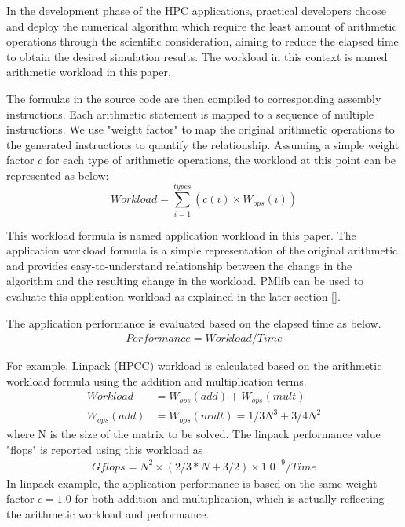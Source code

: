 \documentclass[conference]{IEEEtran}
\begin{document}
In the development phase of the HPC applications, practical developers
choose and deploy the numerical algorithm which require the least
amount of arithmetic operations through the scientific consideration,
aiming to reduce the elapsed time to obtain the desired simulation results.
The workload in this context is named arithmetic workload in this paper.


The formulas in the source code are then compiled to corresponding assembly
instructions.
Each arithmetic statement is mapped to a sequence of multiple instructions.
We use "weight factor" to map the original arithmetic operations to the
generated instructions to quantify the relationship.
Assuming a simple weight factor $ c $ for each type of
arithmetic operations, 
the workload at this point can be represented as below:
\begin{equation}\label{application-workload}
		Workload = \sum_{i=1}^{types} \left(c(i)\times W_{ops}(i)\right)
\end{equation}

This workload formula is named application workload in this paper.
The application workload formula is a simple representation of the original
arithmetic and provides easy-to-understand relationship between the change
in the algorithm and the resulting change in the workload.
PMlib can be used to evaluate this application workload as explained
in the later section \ref{}.

The application performance is evaluated based on the elapsed time as below.
\begin{align}\label{performance-workload-time}
Performance = Workload / Time 
\end{align}

For example, Linpack (HPCC) 
\cite{}
workload is calculated based on the arithmetic workload formula
using the addition and multiplication terms.
\begin{align}
		Workload & = W_{ops}(add) + W_{ops}(mult) \\
		W_{ops}(add) & = W_{ops}(mult) = 1/3 N^{3} + 3/4 N^{2}
\end{align}
where N is the size of the matrix to be solved.
The linpack performance value "flops" is reported using this workload as
\begin{align*}
Gflops = N^{2} \times ( 2/3 * N + 3/2 ) \times 1.0^{-9} / Time 
\end{align*}
In linpack example, the application performance is based on
the same weight factor $ c = 1.0 $ 
for both addition and multiplication, which is actually reflecting the
arithmetic workload and performance.
\end{document}
